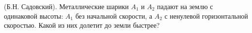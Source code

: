 (Б.Н. Садовский).
Металлические шарики $A_1$ и $A_2$ падают на землю с одинаковой высоты:
$A_1$ без начальной скорости, а $A_2$ с ненулевой горизонтальной
скоростью. Какой из них долетит до земли быстрее?
